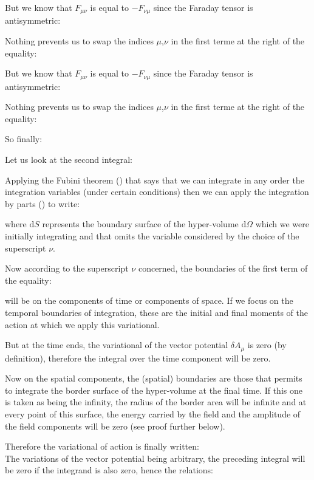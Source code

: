 	But we know that $F_{\mu\nu}$ is equal to $-F_{\nu\mu}$ since the Faraday tensor is antisymmetric:
	
	Nothing prevents us to swap the indices $\mu$,$\nu$ in the first terme at the right of the equality:
	
	But we know that $F_{\mu\nu}$ is equal to $-F_{\nu\mu}$ since the Faraday tensor is antisymmetric:
	
	Nothing prevents us to swap the indices $\mu$,$\nu$ in the first terme at the right of the equality:
	
	So finally:
	
	Let us look at the second integral:
	
	Applying the Fubini theorem () that says that we can integrate in any order the integration variables (under certain conditions) then we can apply the integration by parts () to write:
	
	where $\mathrm{d}S$ represents the boundary surface of the hyper-volume $\mathrm{d}\Omega$ which we were initially integrating and that omits the variable considered by the choice of the superscript $\nu$.

	Now according to the superscript $\nu$ concerned, the boundaries of the first term of the equality:
	
	will be on the components of time or components of space. If we focus on the temporal boundaries of integration, these are the initial and final moments of the action at which we apply this variational.
	
	But at the time ends, the variational of the vector potential $\delta A_\mu$ is zero (by definition), therefore the integral over the time component will be zero.

	Now on the spatial components, the (spatial) boundaries are those that permits to integrate the border surface of the hyper-volume at the final time. If this one is taken as being the infinity, the radius of the border area will be infinite and at every point of this surface, the energy carried by the field and the amplitude of the field components will be zero (see proof further below).

	Therefore the variational of action is finally written:
	\\
	The variations of the vector potential being arbitrary, the preceding integral will be zero if the integrand is also zero, hence the relations:
	
